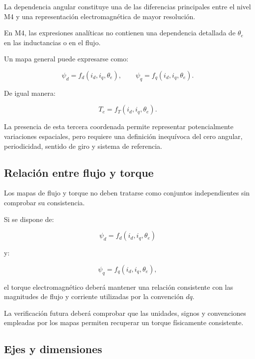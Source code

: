 La dependencia angular constituye una de las diferencias principales entre el nivel M4 y una representación electromagnética de mayor resolución.

En M4, las expresiones analíticas no contienen una dependencia detallada de $\theta_e$ en las inductancias o en el flujo.

Un mapa general puede expresarse como:

\begin{equation}
\psi_d=f_d(i_d,i_q,\theta_e),
\qquad
\psi_q=f_q(i_d,i_q,\theta_e).
\end{equation}

De igual manera:

\begin{equation}
T_e=f_T(i_d,i_q,\theta_e).
\end{equation}

La presencia de esta tercera coordenada permite representar potencialmente variaciones espaciales, pero requiere una definición inequívoca del cero angular, periodicidad, sentido de giro y sistema de referencia.

\subsection{Relación entre flujo y torque}

Los mapas de flujo y torque no deben tratarse como conjuntos independientes sin comprobar su consistencia.

Si se dispone de:

\begin{equation}
\psi_d=f_d(i_d,i_q,\theta_e)
\end{equation}

y:

\begin{equation}
\psi_q=f_q(i_d,i_q,\theta_e),
\end{equation}

el torque electromagnético deberá mantener una relación consistente con las magnitudes de flujo y corriente utilizadas por la convención $dq$.

La verificación futura deberá comprobar que las unidades, signos y convenciones empleadas por los mapas permiten recuperar un torque físicamente consistente.

\subsection{Ejes y dimensiones}

